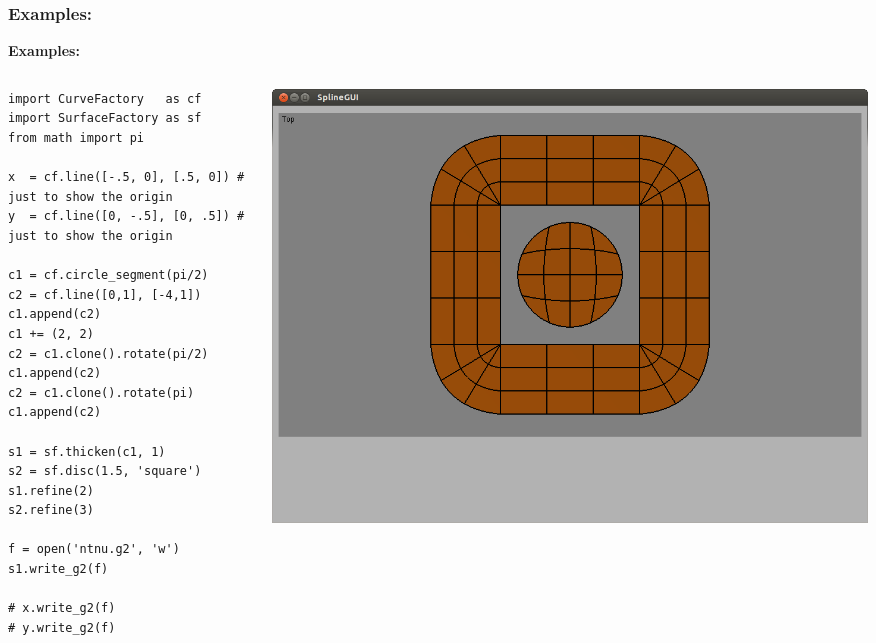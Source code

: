 \documentclass{beamer}
\theoremstyle{plain}
\theoremstyle{definition}
\begin{document}
\begin{frame}[fragile]
\frametitle{Examples:}
\textbf{Examples:}
\begin{columns}
    \begin{column}{.50\linewidth}
        \begin{listing}[H]
            \tiny
            \begin{verbatim}
import CurveFactory   as cf
import SurfaceFactory as sf
from math import pi

x  = cf.line([-.5, 0], [.5, 0]) # just to show the origin
y  = cf.line([0, -.5], [0, .5]) # just to show the origin

c1 = cf.circle_segment(pi/2)
c2 = cf.line([0,1], [-4,1])
c1.append(c2)
c1 += (2, 2)
c2 = c1.clone().rotate(pi/2)
c1.append(c2)
c2 = c1.clone().rotate(pi)
c1.append(c2)

s1 = sf.thicken(c1, 1)
s2 = sf.disc(1.5, 'square')
s1.refine(2)
s2.refine(3)

f = open('ntnu.g2', 'w')
s1.write_g2(f)

# x.write_g2(f)
# y.write_g2(f)
            \end{verbatim}
        \end{listing}
    \end{column}
    \begin{column}{.45\linewidth}
        \includegraphics[width=\linewidth]{ntnu6}
    \end{column}
\end{columns}

\end{frame}

\end{document}

